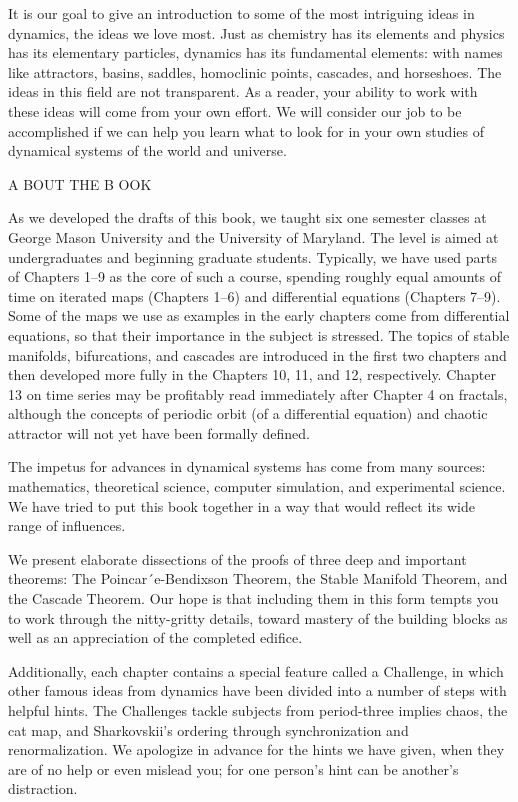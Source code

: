 \documentclass[12pt]{article}
\begin{document}
It is our goal to give an introduction to some of the most intriguing ideas in dynamics, the ideas we love 
most. Just as chemistry has its elements and physics has its elementary particles, dynamics has its 
fundamental elements: with names like attractors, basins, saddles, homoclinic points, cascades, and 
horseshoes. The ideas in this ﬁeld are not transparent. As a reader, your ability to work with these ideas 
will come from your own effort. We will consider our job to be accomplished if we can help you learn what 
to look for in your own studies of dynamical systems of the world and universe.

A BOUT THE B OOK

As we developed the drafts of this book, we taught six one semester classes at George Mason University and 
the University of Maryland. The level is aimed at undergraduates and beginning graduate students. 
Typically, we have used parts of Chapters 1–9 as the core of such a course, spending roughly equal amounts 
of time on iterated maps (Chapters 1–6) and differential equations (Chapters 7–9). Some of the maps we use 
as examples in the early chapters come from differential equations, so that their importance in the subject 
is stressed. The topics of stable manifolds, bifurcations, and cascades are introduced in the ﬁrst two 
chapters and then developed more fully in the Chapters 10, 11, and 12, respectively. Chapter 13 on time 
series may be proﬁtably read immediately after Chapter 4 on fractals, although the concepts of periodic 
orbit (of a differential equation) and chaotic attractor will not yet have been formally deﬁned.

The impetus for advances in dynamical systems has come from many sources: mathematics, theoretical science, 
computer simulation, and experimental science. We have tried to put this book together in a way that would reﬂect its wide range of 
inﬂuences.

We present elaborate dissections of the proofs of three deep and important theorems: The 
Poincar´e-Bendixson Theorem, the Stable Manifold Theorem, and the Cascade Theorem. Our hope is that 
including them in this form tempts you to work through the nitty-gritty details, toward mastery of the 
building blocks as well as an appreciation of the completed ediﬁce.

Additionally, each chapter contains a special feature called a Challenge, in which other famous ideas from 
dynamics have been divided into a number of steps with helpful hints. The Challenges tackle subjects from 
period-three implies chaos, the cat map, and Sharkovskii’s ordering through synchronization and 
renormalization. We apologize in advance for the hints we have given, when they are of no help or even 
mislead you; for one person’s hint can be another’s distraction.
\end{document}
